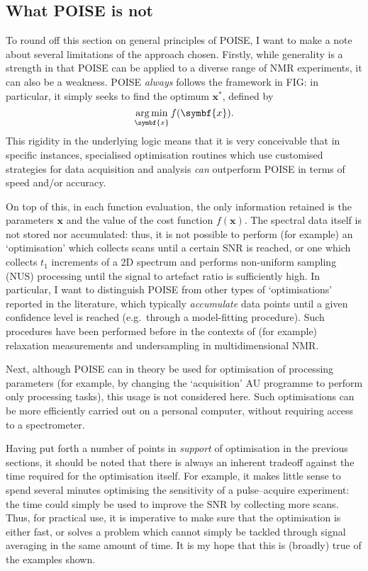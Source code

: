 \subsection{What POISE is not}
\label{subsec:poise__notpoise}

To round off this section on general principles of POISE, I want to make a note about several limitations of the approach chosen. 
Firstly, while generality is a strength in that POISE can be applied to a diverse range of NMR experiments, it can also be a weakness.
POISE \textit{always} follows the framework in FIG: in particular, it simply seeks to find the optimum $\symbf{x}^*$, defined by
\begin{equation}
    \label{eq:poise_argmin}
    \underset{\symbf{x}}{\argmin}\, f(\symbf{x}).
\end{equation}
This rigidity in the underlying logic means that it is very conceivable that in specific instances, specialised optimisation routines which use customised strategies for data acquisition and analysis \textit{can} outperform POISE in terms of speed and/or accuracy.

On top of this, in each function evaluation, the only information retained is the parameters $\symbf{x}$ and the value of the cost function $f(\symbf{x})$.
The spectral data itself is not stored nor accumulated: thus, it is not possible to perform (for example) an `optimisation' which collects scans until a certain SNR is reached, or one which collects $t_1$ increments of a 2D spectrum and performs non-uniform sampling (NUS) processing until the signal to artefact ratio is sufficiently high.
In particular, I want to distinguish POISE from other types of `optimisations' reported in the literature, which typically \textit{accumulate} data points until a given confidence level is reached (e.g.\ through a model-fitting procedure).
Such procedures have been performed before in the contexts of (for example) relaxation measurements\autocite{Song2018JMR,Tang2019SR} and undersampling in multidimensional NMR\autocite{Eghbalnia2005JACS,Hansen2016ACIE,BrukerSmartDriveNMR}.

Next, although POISE can in theory be used for optimisation of processing parameters (for example, by changing the `acquisition' AU programme to perform only processing tasks), this usage is not considered here.
Such optimisations can be more efficiently carried out on a personal computer, without requiring access to a spectrometer.

Having put forth a number of points in \textit{support} of optimisation in the previous sections, it should be noted that there is always an inherent tradeoff against the time required for the optimisation itself.
For example, it makes little sense to spend several minutes optimising the sensitivity of a pulse--acquire experiment: the time could simply be used to improve the SNR by collecting more scans.
Thus, for practical use, it is imperative to make sure that the optimisation is either fast, or solves a problem which cannot simply be tackled through signal averaging in the same amount of time.
It is my hope that this is (broadly) true of the examples shown.

